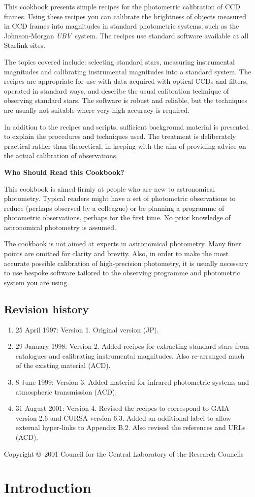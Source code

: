 \documentclass[twoside,11pt]{article}
\newcommand{\stardocinitials}  {SC}
\newcommand{\stardoccopyright} {Copyright \copyright\ 2001 Council for the
Central Laboratory of the Research Councils}
\newcommand{\stardocnumber}    {6.4}
\newcommand{\stardocabstract}
{This cookbook presents simple recipes for the photometric calibration
of CCD frames.  Using these recipes you can calibrate the brightness
of objects measured in CCD frames into magnitudes in standard
photometric systems, such as the Johnson-Morgan {\it UBV}\, system.
The recipes use standard software available at all Starlink sites.

The topics covered include: selecting standard stars, measuring
instrumental magnitudes and calibrating instrumental magnitudes into a
standard system.  The recipes are appropriate for use with data acquired
with optical CCDs and filters, operated in standard ways, and describe the
usual calibration technique of observing standard stars.  The software
is robust and reliable, but the techniques are usually not suitable where
very high accuracy is required.

In addition to the recipes and scripts, sufficient background material
is presented to explain the procedures and techniques used.  The
treatment is deliberately practical rather than theoretical, in keeping
with the aim of providing advice on the actual calibration of observations.

\begin{latexonly}
\vspace{5mm}
\end{latexonly}

\begin{center}
{\bf Who Should Read this Cookbook?}
\end{center}

This cookbook is aimed firmly at people who are new to astronomical
photometry.  Typical readers might have a set of photometric observations
to reduce (perhaps observed by a colleague) or be planning a programme of
photometric observations, perhaps for the first time.  No prior knowledge
of astronomical photometry is assumed.

The cookbook is not aimed at experts in astronomical photometry.  Many
finer points are omitted for clarity and brevity.  Also, in order to
make the most accurate possible calibration of high-precision photometry,
it is usually necessary to use bespoke software tailored to the
observing programme and photometric system you are using.}
\newcommand{\stardocname}{\stardocinitials /\stardocnumber}
\newenvironment{latexonly}{}{}
\newcommand{\xlabel}[1]{}
\newcommand{\latexonlytoc}[0]{\tableofcontents}
\renewcommand{\thepage}{\roman{page}}
\begin{document}
\stardocabstract
 \newpage

 \subsection*{Revision history}

 \begin{enumerate}

   \item 25 April 1997: Version 1. Original version (JP).

   \item 29 January 1998: Version 2.  Added recipes for extracting
    standard stars from catalogues and calibrating instrumental
    magnitudes.  Also re-arranged much of the existing material (ACD).

   \item 8 June 1999: Version 3.  Added material for infrared
    photometric systems and atmospheric transmission (ACD).

   \item 31 August 2001: Version 4.  Revised the recipes to correspond to
    GAIA version 2.6 and CURSA version 6.3.  Added an additional label to
    allow external hyper-links to Appendix B.2.  Also revised the references
    and URLs (ACD).

 \end{enumerate}

 \vspace*{\fill}
 \stardoccopyright

 \cleardoublepage
 \begin{latexonly}
   \setlength{\parskip}{0mm}
   \latexonlytoc

   \newpage
   \listoffigures
   \listoftables

   \setlength{\parskip}{\medskipamount}
   \markboth{\stardocname}{\stardocname}
 \end{latexonly}
\cleardoublepage
\newpage
\renewcommand{\thepage}{\arabic{page}}
\setcounter{page}{1}

\section{\xlabel{INTRO}\label{INTRO}Introduction}
\end{document}
